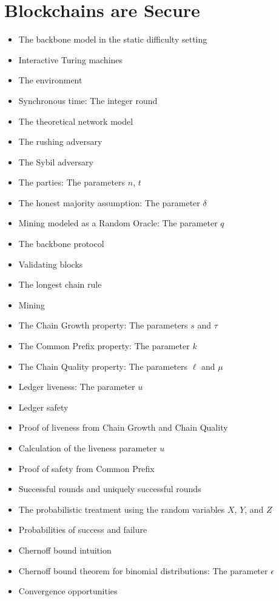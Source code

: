 \chapter{Blockchains are Secure}

{\color{red}
\begin{itemize}
\item The backbone model in the static difficulty setting
\item Interactive Turing machines
\item The environment
\item Synchronous time: The integer round
\item The theoretical network model
\item The rushing adversary
\item The Sybil adversary
\item The parties: The parameters $n$, $t$
\item The honest majority assumption: The parameter $\delta$
\item Mining modeled as a Random Oracle: The parameter $q$
\item The backbone protocol
\item Validating blocks
\item The longest chain rule
\item Mining
\item The Chain Growth property: The parameters $s$ and $\tau$
\item The Common Prefix property: The parameter $k$
\item The Chain Quality property: The parameters $\ell$ and $\mu$
\item Ledger liveness: The parameter $u$
\item Ledger safety
\item Proof of liveness from Chain Growth and Chain Quality
\item Calculation of the liveness parameter $u$
\item Proof of safety from Common Prefix
\item Successful rounds and uniquely successful rounds
\item The probabilistic treatment using the random variables $X$, $Y$, and $Z$
\item Probabilities of success and failure
\item Chernoff bound intuition
\item Chernoff bound theorem for binomial distributions: The parameter $\epsilon$
\item Convergence opportunities

\end{itemize}}
